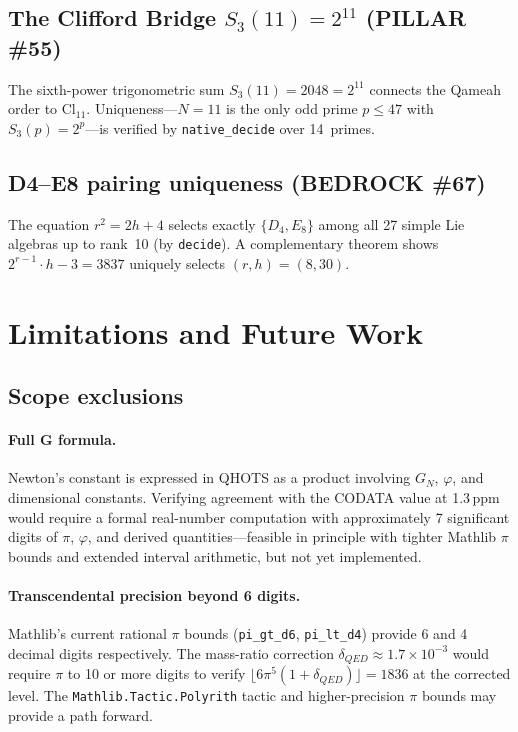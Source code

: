 \documentclass[11pt,a4paper]{article}
\begin{document}
\subsection{The Clifford Bridge $S_3(11)=2^{11}$ (PILLAR \#55)}

The sixth-power trigonometric sum $S_3(11)=2048=2^{11}$ connects the
Qameah order to $\mathrm{Cl}_{11}$.  Uniqueness---$N{=}11$ is the only
odd prime $p\leq 47$ with $S_3(p)=2^p$---is verified by
\texttt{native\_decide} over 14~primes.

\subsection{D4--E8 pairing uniqueness (BEDROCK \#67)}

The equation $r^2 = 2h + 4$ selects exactly $\{D_4, E_8\}$ among all 27
simple Lie algebras up to rank~10 (by \texttt{decide}).  A complementary
theorem shows $2^{r-1}\cdot h - 3 = 3837$ uniquely selects $(r,h)=(8,30)$.

\section{Limitations and Future Work}
\label{sec:limitations}

\subsection{Scope exclusions}

\paragraph{Full G formula.}
Newton's constant is expressed in QHOTS as a product involving $G_N$,
$\varphi$, and dimensional constants.  Verifying agreement with the
CODATA value at 1.3\,ppm would require a formal real-number computation
with approximately 7 significant digits of $\pi$, $\varphi$, and
derived quantities---feasible in principle with tighter Mathlib $\pi$ bounds
and extended interval arithmetic, but not yet implemented.

\paragraph{Transcendental precision beyond 6 digits.}
Mathlib's current rational $\pi$ bounds (\texttt{pi\_gt\_d6},
\texttt{pi\_lt\_d4}) provide 6 and 4 decimal digits respectively.
The mass-ratio correction $\delta_{QED} \approx 1.7\times 10^{-3}$
would require $\pi$ to 10 or more digits to verify
$\lfloor 6\pi^5(1+\delta_{QED})\rfloor = 1836$ at the corrected level.
The \texttt{Mathlib.Tactic.Polyrith} tactic and higher-precision
$\pi$ bounds may provide a path forward.
\end{document}

